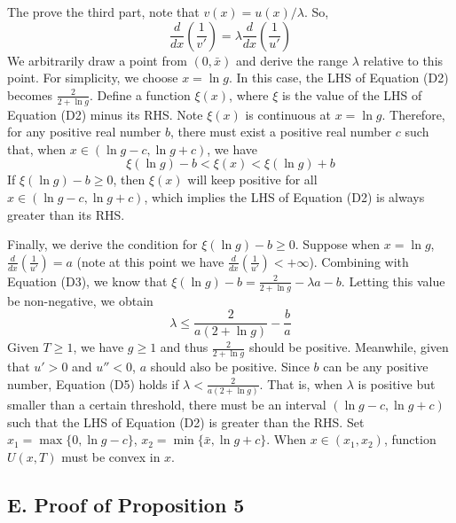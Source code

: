 \documentclass[
  12pt,
]{article}
\begin{document}
The prove the third part, note that \(v(x)=u(x)/\lambda\). So, \[
\frac{d}{dx}\left(\frac{1}{v'}\right)=\lambda\frac{d}{dx}\left(\frac{1}{u'}\right)
\]We arbitrarily draw a point from \((0,\bar{x})\) and derive the range
\(\lambda\) relative to this point. For simplicity, we choose
\(x=\ln g\). In this case, the LHS of Equation (D2) becomes
\(\frac{2}{2+\ln g}\). Define a function \(\xi(x)\), where \(\xi\) is
the value of the LHS of Equation (D2) minus its RHS. Note \(\xi(x)\) is
continuous at \(x=\ln g\). Therefore, for any positive real number
\(b\), there must exist a positive real number \(c\) such that, when
\(x\in(\ln g-c,\ln g+c)\), we have\[\tag{D4}
\xi(\ln g)-b<\xi(x)<\xi(\ln g)+b
\]If \(\xi(\ln g)-b\geq 0\), then \(\xi(x)\) will keep positive for all
\(x\in(\ln g-c,\ln g+c)\), which implies the LHS of Equation (D2) is
always greater than its RHS.

Finally, we derive the condition for \(\xi(\ln g)-b\geq 0\). Suppose
when \(x=\ln g\), \(\frac{d}{dx}\left(\frac{1}{u'}\right)=a\) (note at
this point we have \(\frac{d}{dx}\left(\frac{1}{u'}\right)<+\infty\)).
Combining with Equation (D3), we know that
\(\xi(\ln g)-b =\frac{2}{2+\ln g}-\lambda a-b\). Letting this value be
non-negative, we obtain\[\tag{D5}
\lambda \leq \frac{2}{a(2+\ln g)}-\frac{b}{a}
\]Given \(T\geq1\), we have \(g\geq 1\) and thus \(\frac{2}{2+\ln g}\)
should be positive. Meanwhile, given that \(u'>0\) and \(u''<0\), \(a\)
should also be positive. Since \(b\) can be any positive number,
Equation (D5) holds if \(\lambda <\frac{2}{a(2+\ln g)}\). That is, when
\(\lambda\) is positive but smaller than a certain threshold, there must
be an interval \((\ln g-c,\ln g+c)\) such that the LHS of Equation (D2)
is greater than the RHS. Set \(x_1 = \max\{0,\ln g-c\}\),
\(x_2=\min\{\bar{x}, \ln g +c\}\). When \(x\in (x_1,x_2)\), function
\(U(x,T)\) must be convex in \(x\).

\hypertarget{e.-proof-of-proposition-5}{%
\subsection*{E. Proof of Proposition
5}\label{e.-proof-of-proposition-5}}
\end{document}

